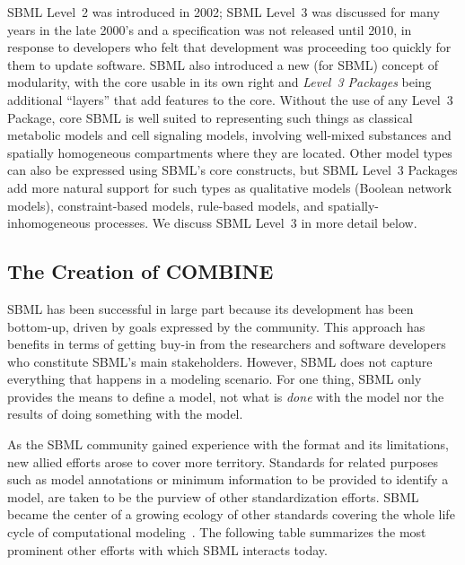 SBML Level~2 was introduced in 2002; SBML Level~3 was discussed for many years in the late 2000's and a specification was not released until 2010, in response to developers who felt that development was proceeding too quickly for them to update software.  SBML also introduced a new (for SBML) concept of modularity, with the core usable in its own right and \emph{Level~3 Packages} being additional ``layers'' that add features to the core.  Without the use of any Level~3 Package, core SBML is well suited to representing such things as classical metabolic models and cell signaling models, involving well-mixed substances and spatially homogeneous compartments where they are located.  Other model types can also be expressed using SBML's core constructs, but SBML Level~3 Packages add more natural support for such types as qualitative models (\eg Boolean network models), constraint-based models, rule-based models, and spatially-inhomogeneous processes.  We discuss SBML Level~3 in more detail below.


\subsection{The Creation of COMBINE}

SBML has been successful in large part because its development has been bottom-up, driven by goals expressed by the community.  This approach has benefits in terms of getting buy-in from the researchers and software developers who constitute SBML's main stakeholders.  However, SBML does not capture everything that happens in a modeling scenario.  For one thing, SBML only provides the means to define a model, not what is \emph{done} with the model nor the results of doing something with the model.

As the SBML community gained experience with the format and its limitations, new allied efforts arose to cover more territory.  Standards for related purposes such as model annotations or minimum information to be provided to identify a model, are taken to be the purview of other standardization efforts.  SBML became the center of a growing ecology of other standards covering the whole life cycle of computational modeling~\cite{le_novere_2005, lenovere_2006b, miaseweb, kisaoweb, teddyweb, sbrml}.  The following table summarizes the most prominent other efforts with which SBML interacts today.

